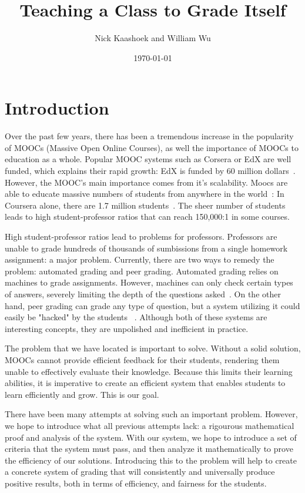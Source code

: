 \documentclass[12pt, Helvetica]{article}
\title{Teaching a Class to Grade Itself}
\author{Nick Kaashoek and William Wu}
\date{\today}
\begin{document}
\maketitle
\section{Introduction}
Over the past few years, there has been a tremendous increase in the popularity of MOOCs (Massive Open Online Courses), as well the importance of MOOCs to education as a whole. Popular MOOC systems such as Corsera or EdX are well funded, which explains their rapid growth: EdX is funded by 60 million dollars~\cite{canmoocsreducecc}. However, the MOOC's main importance comes from it's scalability. Moocs are able to educate massive numbers of students from anywhere in the world~\cite{makingsenseofmoocs}: In Coursera alone, there are 1.7 million students~\cite{swotanalysisofmoocs}. The sheer number of students leads to high student-professor ratios that can reach 150,000:1 in some courses.

High student-professor ratios lead to problems for professors. Professors are unable to grade hundreds of thousands of sumbissions from a single homework assignment: a major problem. Currently, there are two ways to remedy the problem: automated grading and peer grading. Automated grading relies on machines to grade assignments. However, machines can only check certain types of answers, severely limiting the depth of the questions asked~\cite{rightandwrongmoocs}. On the other hand, peer grading can grade any type of question, but a system utilizing it could easily be "hacked" by the students ~\cite{makingsenseofmoocs}. Although both of these systems are interesting concepts, they are unpolished and inefficient in practice.

The problem that we have located is important to solve. Without a solid solution, MOOCs cannot provide efficient feedback for their students, rendering them unable to effectively evaluate their knowledge. Because this limits their learning abilities, it is imperative to create an efficient system that enables students to learn efficiently and grow. This is our goal.

There have been many attempts at solving such an important problem. However, we hope to introduce what all previous attempts lack: a rigourous mathematical proof and analysis of the system. With our system, we hope to introduce a set of criteria that the system must pass, and then analyze it mathematically to prove the efficiency of our solutions. Introducing this to the problem will help to create a concrete system of grading that will consistently and universally produce positive results, both in terms of efficiency, and fairness for the students.
\end{document}
